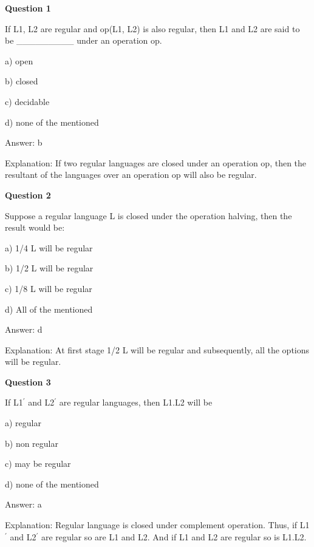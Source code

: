 \documentclass{article}
\begin{document}
\begin{mdframed}[linewidth=1pt, roundcorner=5pt, linecolor=gray!30, backgroundcolor=gray!5]
\textbf{Question 1} 

If L1, L2 are regular and op(L1, L2) is also regular, then L1 and L2 are said to be \_\_\_\_\_\_\_\_\_ under an operation op.

a) open

b) closed

c) decidable

d) none of the mentioned
\vspace{5pt} \par
\begin{tcolorbox}[colback=green!5, colframe=green!40!black, title=Solution]
Answer: b

Explanation: If two regular languages are closed under an operation op, then the resultant of the languages over an operation op will also be regular.
\end{tcolorbox}
\end{mdframed}

\begin{mdframed}[linewidth=1pt, roundcorner=5pt, linecolor=gray!30, backgroundcolor=gray!5]
\textbf{Question 2} 

Suppose a regular language L is closed under the operation halving, then the result would be:

a) 1/4 L will be regular

b) 1/2 L will be regular

c) 1/8 L will be regular

d) All of the mentioned
\vspace{5pt} \par
\begin{tcolorbox}[colback=green!5, colframe=green!40!black, title=Solution]
Answer: d

Explanation: At first stage 1/2 L will be regular and subsequently, all the options will be regular.
\end{tcolorbox}
\end{mdframed}

\begin{mdframed}[linewidth=1pt, roundcorner=5pt, linecolor=gray!30, backgroundcolor=gray!5]
\textbf{Question 3} 

If L1$^\prime$ and L2$^\prime$ are regular languages, then L1.L2 will be

a) regular

b) non regular

c) may be regular

d) none of the mentioned
\vspace{5pt} \par
\begin{tcolorbox}[colback=green!5, colframe=green!40!black, title=Solution]
Answer: a

Explanation: Regular language is closed under complement operation. Thus, if L1$^\prime$ and L2$^\prime$ are regular so are L1 and L2. And if L1 and L2 are regular so is L1.L2.
\end{tcolorbox}
\end{mdframed}
\newpage
\end{document}
